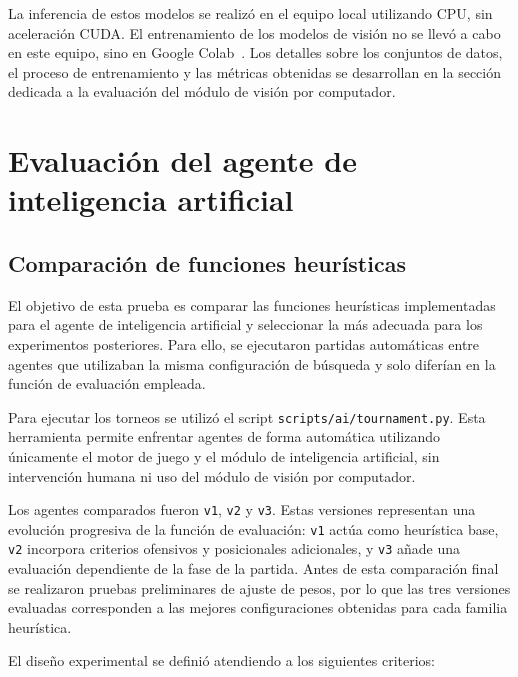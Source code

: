 La inferencia de estos modelos se realizó en el equipo local utilizando CPU, sin aceleración CUDA. El entrenamiento de los modelos de visión no se llevó a cabo en este equipo, sino en Google Colab~\cite{google_colab}. Los detalles sobre los conjuntos de datos, el proceso de entrenamiento y las métricas obtenidas se desarrollan en la sección dedicada a la evaluación del módulo de visión por computador.


\section{Evaluación del agente de inteligencia artificial}
\label{sec:evaluacion-agente-ia}


\subsection{Comparación de funciones heurísticas}
\label{subsec:comparacion-heuristicas}

El objetivo de esta prueba es comparar las funciones heurísticas implementadas para el agente de inteligencia artificial y seleccionar la más adecuada para los experimentos posteriores. Para ello, se ejecutaron partidas automáticas entre agentes que utilizaban la misma configuración de búsqueda y solo diferían en la función de evaluación empleada.

Para ejecutar los torneos se utilizó el script \texttt{scripts/ai/tournament.py}. Esta herramienta permite enfrentar agentes de forma automática utilizando únicamente el motor de juego y el módulo de inteligencia artificial, sin intervención humana ni uso del módulo de visión por computador.

Los agentes comparados fueron \texttt{v1}, \texttt{v2} y \texttt{v3}. Estas versiones representan una evolución progresiva de la función de evaluación: \texttt{v1} actúa como heurística base, \texttt{v2} incorpora criterios ofensivos y posicionales adicionales, y \texttt{v3} añade una evaluación dependiente de la fase de la partida. Antes de esta comparación final se realizaron pruebas preliminares de ajuste de pesos, por lo que las tres versiones evaluadas corresponden a las mejores configuraciones obtenidas para cada familia heurística.

El diseño experimental se definió atendiendo a los siguientes criterios:

